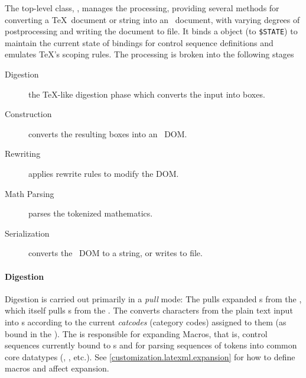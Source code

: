 \documentclass{book}
\newcommand{\ltxcode}{\lstinline[style=inlinelatexml]}
\begin{document}
The top-level class, , manages the processing, providing several methods
for converting a \TeX\ document or string into an \XML\ document, with varying degrees
of postprocessing and writing the document to file.
It binds a  object (to \ltxcode|$STATE|)%
to maintain the current state
of bindings for control sequence definitions and emulates \TeX's scoping rules.
The processing is broken into the following stages
\begin{description}
   \item[Digestion] the \TeX-like digestion phase which converts the input into boxes.
   \item[Construction] converts the resulting boxes into an \XML\ DOM.
   \item[Rewriting] applies rewrite rules to modify the DOM.
   \item[Math Parsing] parses the tokenized mathematics.
   \item[Serialization] converts the \XML\ DOM to a string, or writes to file.
\end{description}

\paragraph{Digestion}\label{architecture.latexml..digestion}
%
%
%
%
%
%
%
%
%
%
%

Digestion is carried out primarily in a \emph{pull} mode: The 
pulls expanded s from the , which itself pulls s from 
the .  The  converts characters from the plain text input
into s according to the current \emph{catcodes} (category codes) assigned to
them (as bound in the ).  
The  is responsible for expanding Macros,
that is, control sequences currently bound to s
and for parsing sequences of tokens into common core datatypes
(, , etc.).
See \ref{customization.latexml.expansion} for how to define macros
and affect expansion.
\end{document}
